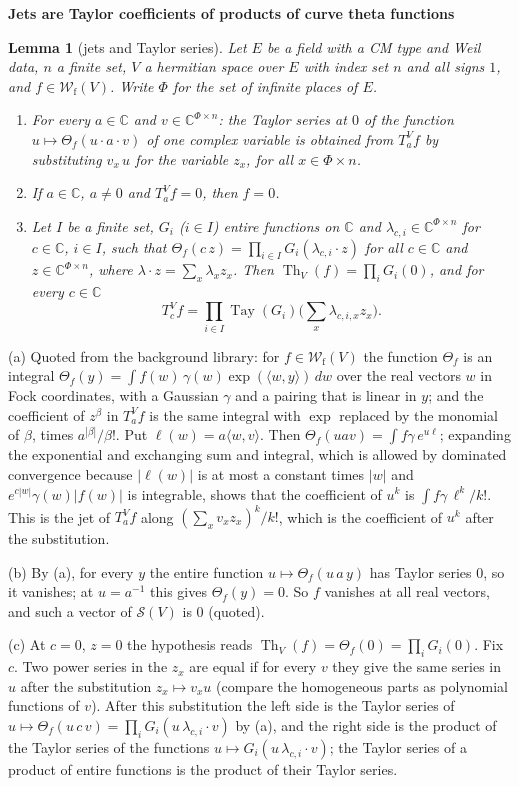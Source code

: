 \documentclass[11pt,a4paper]{article}
\makeatletter
\newcommand{\sect}[2]{\refstepcounter{section}\label{#2}\par\addvspace{19pt plus 4pt minus 2pt}\Needspace{7\baselineskip}%
  \noindent\llap{{\fontsize{13.2}{16}\selectfont\bfseries\color{inkfaint}\thesection}\hspace{9pt}}%
  {\fontsize{13.2}{16}\selectfont\bfseries\color{ink}#1}\par\nopagebreak\vspace{-1pt}}
\theoremstyle{plainx}
\newtheorem{lemma}[theorem]{Lemma}
\theoremstyle{uprightx}
\renewenvironment{proof}[1][Proof]{\par\pushQED{\qed}\normalfont\topsep0pt\partopsep0pt
  \trivlist\item[\hskip\labelsep\itshape #1.]\ignorespaces}{\popQED\endtrivlist\@endpefalse}
\newcommand{\CC}{\mathbb{C}}
\newcommand{\Sw}[1]{\mathcal{S}(#1)}
\newcommand{\Wf}[1]{\mathcal{W}_{\mathrm{f}}(#1)}
\newcommand{\Th}[1]{\operatorname{Th}_{#1}}
\newcommand{\jet}[3]{T^{#1}_{#2}#3}
\newcommand{\Thf}[1]{\Theta_{#1}}
\newcommand{\tay}[1]{\operatorname{Tay}(#1)}
\makeatother
\begin{document}
\sect{Jets are Taylor coefficients of products of curve theta functions}{s:jets}
\begin{lemma}[jets and Taylor series]\label{l:line}
Let $E$ be a field with a CM type and Weil data, $n$ a finite set, $V$ a hermitian space over $E$ with index set
$n$ and all signs $1$, and $f\in\Wf{V}$. Write $\Phi$ for the set of infinite places of $E$.
\begin{enumerate}[label=(\alph*),itemsep=1pt]
\item For every $a\in\CC$ and $v\in\CC^{\Phi\times n}$: the Taylor series at $0$ of the function
$u\mapsto\Thf{f}(u\cdot a\cdot v)$ of one complex variable is obtained from $\jet{V}{a}{f}$ by substituting
$v_x\,u$ for the variable $z_x$, for all $x\in\Phi\times n$.
\item If $a\in\CC$, $a\ne0$ and $\jet{V}{a}{f}=0$, then $f=0$.
\item Let $I$ be a finite set, $G_i$ ($i\in I$) entire functions on $\CC$ and $\lambda_{c,i}\in\CC^{\Phi\times n}$
for $c\in\CC$, $i\in I$, such that $\Thf{f}(c\,z)=\prod_{i\in I}G_i(\lambda_{c,i}\cdot z)$ for all $c\in\CC$ and
$z\in\CC^{\Phi\times n}$, where $\lambda\cdot z=\sum_x\lambda_xz_x$. Then $\Th{V}(f)=\prod_iG_i(0)$, and for
every $c\in\CC$
\[\jet{V}{c}{f}=\prod_{i\in I}\tay{G_i}\bigl(\textstyle\sum_x\lambda_{c,i,x}z_x\bigr) .\]
\end{enumerate}
\end{lemma}
\begin{proof}
(a) Quoted from the background library: for $f\in\Wf{V}$ the function $\Thf{f}$ is an integral
$\Thf{f}(y)=\int f(w)\,\gamma(w)\exp(\langle w,y\rangle)\,dw$ over the real vectors $w$ in Fock coordinates, with a
Gaussian $\gamma$ and a pairing that is linear in $y$; and the coefficient of $z^\beta$ in $\jet{V}{a}{f}$ is the
same integral with $\exp$ replaced by the monomial of $\beta$, times $a^{|\beta|}/\beta!$. Put
$\ell(w)=a\langle w,v\rangle$. Then $\Thf{f}(uav)=\int f\gamma\,e^{u\ell}$; expanding the exponential and exchanging
sum and integral, which is allowed by dominated convergence because $|\ell(w)|$ is at most a constant times $|w|$ and
$e^{c|w|}\gamma(w)|f(w)|$ is integrable, shows that the coefficient of $u^k$ is $\int f\gamma\,\ell^k/k!$. This is
the jet of $\jet{V}{a}{f}$ along $(\sum_xv_xz_x)^k/k!$, which is the coefficient of $u^k$ after the substitution.

(b) By (a), for every $y$ the entire function $u\mapsto\Thf{f}(u\,a\,y)$ has Taylor series $0$, so it vanishes; at
$u=a^{-1}$ this gives $\Thf{f}(y)=0$. So $f$ vanishes at all real vectors, and such a vector of $\Sw{V}$ is $0$
(quoted).

(c) At $c=0$, $z=0$ the hypothesis reads $\Th{V}(f)=\Thf{f}(0)=\prod_iG_i(0)$. Fix $c$. Two power series in the
$z_x$ are equal if for every $v$ they give the same series in $u$ after the substitution $z_x\mapsto v_xu$ (compare
the homogeneous parts as polynomial functions of $v$). After this substitution the left side is the Taylor series
of $u\mapsto\Thf{f}(u\,c\,v)=\prod_iG_i(u\,\lambda_{c,i}\cdot v)$ by (a), and the right side is the product of the
Taylor series of the functions $u\mapsto G_i(u\,\lambda_{c,i}\cdot v)$; the Taylor series of a product of entire
functions is the product of their Taylor series.
\end{proof}
\end{document}
